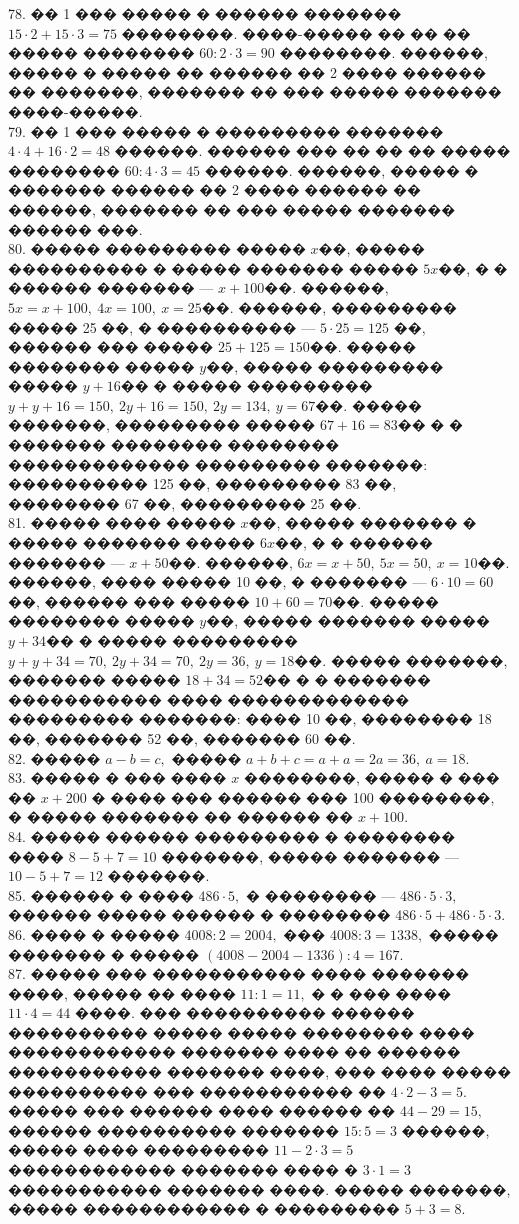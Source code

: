 \documentclass[12pt]{article}
\begin{document}
78. �� 1 ��� ����� � ������ ������� $15\cdot2+15\cdot3=75$ ��������. ����-����� �� �� �� ����� �������� $60:2\cdot3=90$ ��������. ������, ����� � ����� �� ������ �� 2 ���� ������ �� �������, ������� �� ��� ����� ������� ����-�����.\\
79. �� 1 ��� ����� � ��������� ������� $4\cdot4+16\cdot2=48$ ������. ������ ��� �� �� �� ����� �������� $60:4\cdot3=45$ ������. ������, ����� � ������� ������ �� 2 ���� ������ �� ������, ������� �� ��� ����� ������� ������ ���.\\
80. ����� ��������� ����� $x$��, ����� ���������� � ����� ������� ����� $5x$��, � � ������ ������� --- $x+100$��. ������, $5x=x+100,\ 4x=100,\ x=25$��. ������, ��������� ����� 25 ��, � ���������� --- $5\cdot25=125$ ��, ������ ��� ����� $25+125=150$��. ����� �������� ����� $y$��, ����� ��������� ����� $y+16$�� � ����� ��������� $y+y+16=150,\ 2y+16=150,\ 2y=134,\ y=67$��. ����� �������, ��������� ����� $67+16=83$�� � � ������� �������� �������� ������������� ��������� �������: ���������� 125 ��, ��������� 83 ��, �������� 67 ��, ��������� 25 ��.\\
81. ����� ���� ����� $x$��, ����� ������� � ����� ������� ����� $6x$��, � � ������ ������� --- $x+50$��. ������, $6x=x+50,\ 5x=50,\ x=10$��. ������, ���� ����� 10 ��, � ������� --- $6\cdot10=60$��, ������ ��� ����� $10+60=70$��. ����� �������� ����� $y$��, ����� ������� ����� $y+34$�� � ����� ��������� $y+y+34=70,\ 2y+34=70,\ 2y=36,\ y=18$��. ����� �������, ������� ����� $18+34=52$�� � � ������� ����������� ���� ������������� ��������� �������: ���� 10 ��, �������� 18 ��, ������� 52 ��, ������� 60 ��.\\
82. ����� $a-b=c,$ ����� $a+b+c=a+a=2a=36,\ a=18.$\\
83. ����� � ��� ���� $x$ ��������, ����� � ��� �� $x+200$ � ���� ��� ������ ��� 100 ��������, � ����� ������� �� ������ �� $x+100.$\\
84. ����� ������ ��������� � �������� ���� $8-5+7=10$ �������, ����� ������� --- $10-5+7=12$ �������.\\
85. ������ � ���� $486\cdot5,$ � �������� --- $486\cdot5\cdot3,$ ������ ����� ������ � �������� $486\cdot5+486\cdot5\cdot3.$\\
86. ���� � ����� $4008:2=2004,$ ��� $4008:3=1338,$ ����� ������� � ����� $(4008-2004-1336):4=167.$\\
87. ����� ��� ����������� ���� ������� ����, ����� �� ���� $11:1=11,$ � � ��� ���� $11\cdot4=44$ ����. ��� ���������� ������ ���������� ����� ����� �������� ���� ������������ ������� ���� �� ������ ����������� ������� ����, ��� ���� ����� ���������� ��� ����������� �� $4\cdot2-3=5.$ ����� ��� ������ ���� ������ ��  $44-29=15,$ ������ ���������� ������� $15:5=3$ ������, ����� ���� ��������� $11-2\cdot3=5$ ������������ ������� ���� � $3\cdot1=3$ ����������� ������� ����. ����� �������, ����� ������������ � ��������� $5+3=8.$\\
\end{document}
